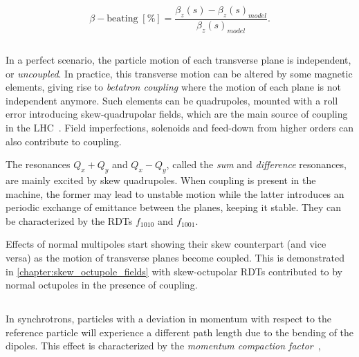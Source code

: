 \begin{equation}
    \beta-\mathrm{beating \; [\%]}  = \frac{\beta_z(s) - \beta_z(s)_{model}}{\beta_z(s)_{model}}.
    \label{eq:beam_optics:beating}
\end{equation}


\subsection{}

In a perfect scenario, the particle motion of each transverse plane is independent, or
\textit{uncoupled}. In practice, this transverse motion can be altered by some magnetic elements,
giving rise to \textit{betatron coupling} where the motion of each plane is not independent anymore.
Such elements can be quadrupoles, mounted with a roll error introducing skew-quadrupolar fields,
which are the main source of coupling in the LHC~\cite{felix_soubelet_local_2023}. Field
imperfections, solenoids and feed-down from higher orders can also contribute to coupling.

The resonances $Q_x + Q_y$ and $Q_x - Q_y$, called the \textit{sum} and \textit{difference}
resonances, are mainly excited by skew quadrupoles. When coupling is present in the
machine, the former may lead to unstable motion while the latter introduces an periodic exchange of
emittance between the planes, keeping it stable. They can be characterized by the RDTs $f_{1010}$
and $f_{1001}$.

Effects of normal multipoles start showing their skew counterpart (and vice versa) as the motion
of transverse planes become coupled. This is demonstrated in \cref{chapter:skew_octupole_fields}
with skew-octupolar RDTs contributed to by normal octupoles in the presence of coupling.


\subsection{}
\label{subsection:coordinates_systems:momentum_compaction_factor}

In synchrotrons, particles with a deviation in momentum with respect to the reference particle will
experience a different path length due to the bending of the dipoles. This effect is characterized
by the \textit{momentum compaction factor}~\cite{keintzel_jacqueline_beam_nodate},

